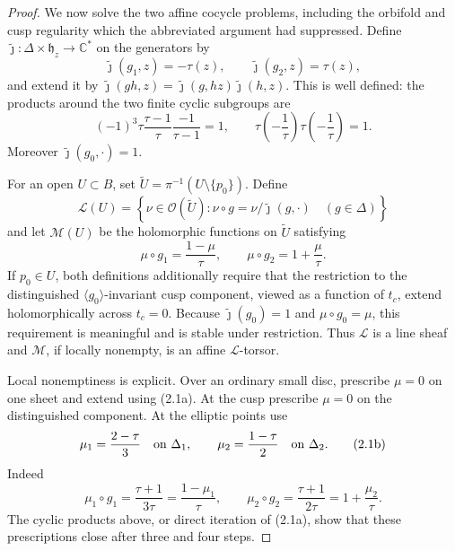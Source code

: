 \begin{proof}
We now solve the two affine cocycle problems, including the orbifold and
cusp regularity which the abbreviated argument had suppressed.  Define
\(\widetilde\jmath:\Delta\times\mathfrak h_z\to\mathbb C^*\) on the
generators by
\[
 \widetilde\jmath(g_1,z)=-\tau(z),\qquad
 \widetilde\jmath(g_2,z)=\tau(z),
\]
and extend it by
\(\widetilde\jmath(gh,z)=\widetilde\jmath(g,hz)
\widetilde\jmath(h,z)\).  This is well defined: the products around the
two finite cyclic subgroups are
\[
 (-1)^3\tau\frac{\tau-1}{\tau}\frac{-1}{\tau-1}=1,
 \qquad
 \tau\left(-\frac1\tau\right)\tau\left(-\frac1\tau\right)=1.
\]
Moreover \(\widetilde\jmath(g_0,\cdot)=1\).

For an open \(U\subset B\), set
\(\widetilde U=\pi^{-1}(U\setminus\{p_0\})\).  Define
\[
 \mathcal L(U)=\left\{\nu\in\mathcal O(\widetilde U):
 \nu\circ g=\nu/\widetilde\jmath(g,\cdot)\quad(g\in\Delta)\right\}
\]
and let \(\mathcal M(U)\) be the holomorphic functions on
\(\widetilde U\) satisfying
\[
 \mu\circ g_1=\frac{1-\mu}{\tau},\qquad
 \mu\circ g_2=1+\frac\mu\tau.
 \tag{2.1a}
\]
If \(p_0\in U\), both definitions additionally require that the restriction
to the distinguished \(\langle g_0\rangle\)-invariant cusp component,
viewed as a function of \(t_c\), extend holomorphically across \(t_c=0\).
Because \(\widetilde\jmath(g_0)=1\) and \(\mu\circ g_0=\mu\), this
requirement is meaningful and is stable under restriction.  Thus
\(\mathcal L\) is a line sheaf and \(\mathcal M\), if locally nonempty, is
an affine \(\mathcal L\)-torsor.

Local nonemptiness is explicit.  Over an ordinary small disc, prescribe
\(\mu=0\) on one sheet and extend using (2.1a).  At the cusp prescribe
\(\mu=0\) on the distinguished component.  At the elliptic points use
\[
 \mu_1=\frac{2-\tau}{3}\quad\hbox{on }\Delta_1,
 \qquad
 \mu_2=\frac{1-\tau}{2}\quad\hbox{on }\Delta_2.
 \tag{2.1b}
\]
Indeed
\[
 \mu_1\circ g_1=\frac{\tau+1}{3\tau}
 =\frac{1-\mu_1}{\tau},
 \qquad
 \mu_2\circ g_2=\frac{\tau+1}{2\tau}
 =1+\frac{\mu_2}{\tau}.
\]
The cyclic products above, or direct iteration of (2.1a), show that these
prescriptions close after three and four steps.


\end{proof}
